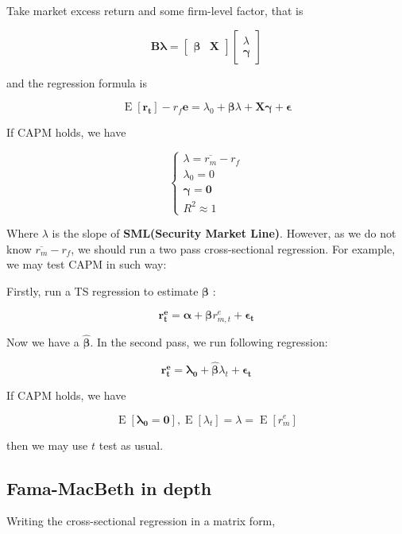 \documentclass{article}
\begin{document}
Take market excess return and some firm-level factor, that is

\[ \bm{\mathbf{B\lambda=\begin{bmatrix}
  \bm{\mathbf{\beta}}&\bm{\mathbf{X}}
\end{bmatrix}}}\begin{bmatrix}
  \lambda\\
  \bm{\mathbf{\gamma}}
\end{bmatrix} \]

and the regression formula is

\[ \mathop{\text{E}}[\bm{\mathbf{r_t}}]-r_f \bm{\mathbf{e}}=\lambda_0+\bm{\mathbf{\beta}}\lambda+\bm{\mathbf{X\gamma}}+\bm{\mathbf{\epsilon}}  \]

If CAPM holds, we have

\[ \begin{cases}
  \lambda=\overline{r_m}-r_f\\
  \lambda_0=0\\
  \bm{\mathbf{\gamma =0 }}\\
  R^2 \approx 1
\end{cases} \]

Where \(\lambda\) is the slope of \textbf{SML(Security Market Line)}.
However, as we do not know \(\overline{r_m}-r_f\), we should run a two
pass cross-sectional regression. For example, we may test CAPM in such
way:

Firstly, run a TS regression to estimate \(\bm{\mathbf{\beta}}\) :

\[ \bm{\mathbf{r_t^e=\alpha}}+\bm{\mathbf{\beta \mathit{r_{m,t}^e}+\epsilon_t}} \]

Now we have a \(\bm{\mathbf{\hat{\beta}}}\). In the second pass, we run
following regression:

\[ \bm{\mathbf{r_t^e=\lambda_0+\hat{\beta}\mathit{\lambda_t}+\epsilon_t}} \]

If CAPM holds, we have

\[ \mathop{\text{E}}[\bm{\mathbf{\lambda_0=0}}], \mathop{\text{E}}[\lambda_t]=\lambda=\mathop{\text{E}}[r_m^e] \]

then we may use \(t\) test as usual.

\hypertarget{fama-macbeth-in-depth}{%
\subsection{Fama-MacBeth in depth}\label{fama-macbeth-in-depth}}

Writing the cross-sectional regression in a matrix form,
\end{document}
